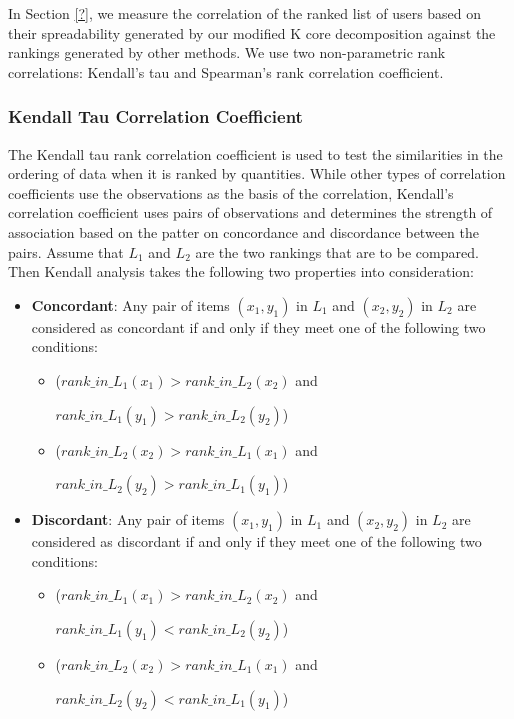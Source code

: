 \documentclass[sigconf]{acmart}
\begin{document}

In Section \ref{?}, we measure the correlation of the ranked list of users based on their spreadability generated by our modified K core decomposition against the rankings generated by other methods. We use two non-parametric rank correlations: Kendall’s tau and Spearman’s rank correlation coefficient.

\subsubsection{Kendall Tau Correlation Coefficient}

The Kendall tau rank correlation coefficient is used to test the similarities in the ordering of data when it is ranked by quantities. While other types of correlation coefficients use the observations as the basis of the correlation, Kendall’s correlation coefficient uses pairs of observations and determines the strength of association based on the patter on concordance and discordance between the pairs. Assume that $L_1$ and $L_2$ are the two rankings that are to be compared. Then Kendall analysis takes the following two properties into consideration:

\begin{itemize}
    \item \textbf{Concordant}: Any pair of items $(x_1,y_1)$ in $L_1$ and $(x_2,y_2)$ in $L_2$ are considered as concordant if and only if they meet one of the following two conditions:
    
    \begin{itemize}
        \item ($rank\_in\_L_1(x_1) > rank\_in\_L_2(x_2)$ and 
        
        $rank\_in\_L_1(y_1) > rank\_in\_L_2(y_2)$)
        
        \item ($rank\_in\_L_2(x_2) > rank\_in\_L_1(x_1)$ and 
        
        $rank\_in\_L_2(y_2) > rank\_in\_L_1(y_1)$)
    \end{itemize}
    
    \item \textbf{Discordant}: Any pair of items $(x_1,y_1)$ in $L_1$ and $(x_2,y_2)$ in $L_2$ are considered as discordant if and only if they meet one of the following two conditions:
    
    \begin{itemize}
        \item ($rank\_in\_L_1(x_1) > rank\_in\_L_2(x_2)$ and 
        
        $rank\_in\_L_1(y_1) < rank\_in\_L_2(y_2)$)
        
        \item ($rank\_in\_L_2(x_2) > rank\_in\_L_1(x_1)$ and 
        
        $rank\_in\_L_2(y_2) < rank\_in\_L_1(y_1)$)
    \end{itemize}
\end{itemize}
\end{document}

